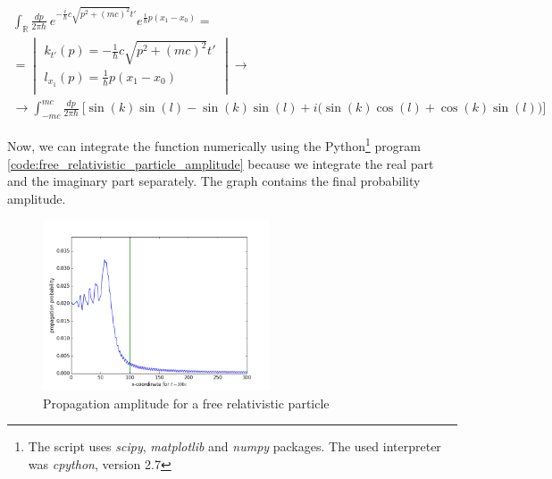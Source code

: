 \begin{equation*}
    \begin{gathered}
        \int_{\mathbb{R}} \frac{dp}{2 \pi \hbar} \ e^{- \frac{i}{\hbar} c \sqrt{p^{2} + (mc)^{2}} t'} e^{\frac{i}{\hbar}p (x_{1} - x_{0})} = \\
        = \begin{vmatrix}
            k_{t'}(p) = - \frac{1}{\hbar} c \sqrt{p^{2} + (mc)^{2}} t' \\
            l_{x_{1}}(p) = \frac{1}{\hbar}p (x_{1} - x_{0}) \\
        \end{vmatrix} \to \\
        \to \int_{-mc}^{mc} \frac{dp}{2 \pi \hbar} \ \bigg[ \sin(k) \sin(l) - \sin(k) \sin(l) + i\big(\sin(k) \cos(l) + \cos(k) \sin(l)\big) \bigg]
    \end{gathered}
\end{equation*}

Now, we can integrate the function numerically using the Python\footnote{The script uses \textit{scipy}, \textit{matplotlib} and \textit{numpy} packages. 
The used interpreter was \textit{cpython}, version 2.7} program \ref{code:free_relativistic_particle_amplitude} because we integrate the 
real part and the imaginary part separately. The graph contains the final probability amplitude.

\begin{figure}[h]
    \centering
    \includegraphics[width=0.6\textwidth]{free_relativistic_particle.png}
    \caption{Propagation amplitude for a free relativistic particle}
    \label{fig:free_relativistic_particle_probability}
\end{figure}

\clearpage

